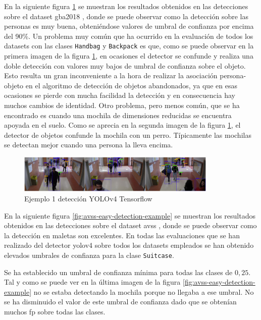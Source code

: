 En la siguiente figura \ref{fig:gba-near-big3-detection-example} se muestran los resultados obtenidos en las detecciones sobre el dataset \gls{gba2018} \cite{gba-dataset}, donde se puede observar como la detección sobre las personas es muy buena, obteniéndose valores de umbral de confianza por encima del 90\%. Un problema muy común que ha ocurrido en la evaluación de todos los datasets con las clases \texttt{Handbag} y \texttt{Backpack} es que, como se puede observar en la primera imagen de la figura \ref{fig:gba-near-big3-detection-example}, en ocasiones el detector se confunde y realiza una doble detección con valores muy bajos de umbral de confianza sobre el objeto. Esto resulta un gran inconveniente a la hora de realizar la asociación persona-objeto en el algoritmo de detección de objetos abandonados, ya que en esas ocasiones se pierde con mucha facilidad la detección y en consecuencia hay muchos cambios de identidad. Otro problema, pero menos común, que se ha encontrado es cuando una mochila de dimensiones reducidas se encuentra apoyada en el suelo. Como se aprecia en la segunda imagen de la figura \ref{fig:gba-near-big3-detection-example}, el detector de objetos confunde la mochila con un perro. Típicamente las mochilas se detectan mejor cuando una persona la lleva encima.

\begin{figure}[ht]
\centering
\includegraphics[width=0.85\textwidth]{img/chapters/resultados/deteccion/gba-near-big3-detection-example.jpg}
\caption{\label{fig:gba-near-big3-detection-example}Ejemplo 1 detección YOLOv4 Tensorflow \cite{gba-dataset}}
\end{figure}

En la siguiente figura \ref{fig:avss-easy-detection-example} se muestran los resultados obtenidos en las detecciones sobre el dataset \gls{avss} \cite{AVSSAB2007-dataset}, donde se puede observar como la detección en maletas son excelentes. En todas las evaluaciones que se han realizado del detector \gls{yolov4} sobre todos los datasets empleados se han obtenido elevados umbrales de confianza para la clase \texttt{Suitcase}.

Se ha establecido un umbral de confianza mínima para todas las clases de $0,25$. Tal y como se puede ver en la última imagen de la figura \ref{fig:avss-easy-detection-example} no se estaba detectando la mochila porque no llegaba a ese umbral. No se ha disminuido el valor de este umbral de confianza dado que se obtenían muchos \gls{fp} sobre todas las clases.

